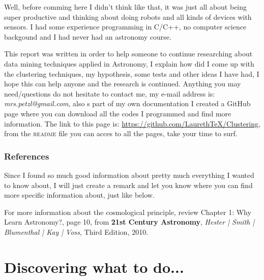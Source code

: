 \documentclass[11pt,fleqn]{book} %
\begin{document}
Well, before comming here I didn't think like that, it was just all about being super productive and thinking about doing robots and all kinds of devices with sensors. I had some experience programming in C/C++, no computer science backgound and I had never had an astronomy course.

This report was written in order to help someone to continue researching about data mining techniques applied in Astronomy, I explain how did I come up with the clustering techniques, my hypothesis, some tests and other ideas I have had, I hope this can help anyone and the research is continued. Anything you may need/questions do not hesitate to contact me, my e-mail address is: \emph{mrs.petzl@gmail.com}, also s part of my own documentation I created a GitHub page where you can download all the codes I programmed and find more information. The link to this page is: \url{https://github.com/LaurethTeX/Clustering}, from the \textsc{readme} file you can acces to all the pages, take your time to surf.

\subsection{References}

Since I found so much good information about pretty much everything I wanted to know about, I will just create a remark and let you know where you can find more specific information about, just like below.

\begin{remark}
For more information about the cosmological principle, review Chapter 1: Why Learn Astronomy?, page 10, from \textbf{21st Century Astronomy}, \textit{Hester | Smith | Blumenthal | Kay | Voss}, Third Edition, 2010.
\end{remark}




\chapter{Discovering what to do...}
\end{document}
